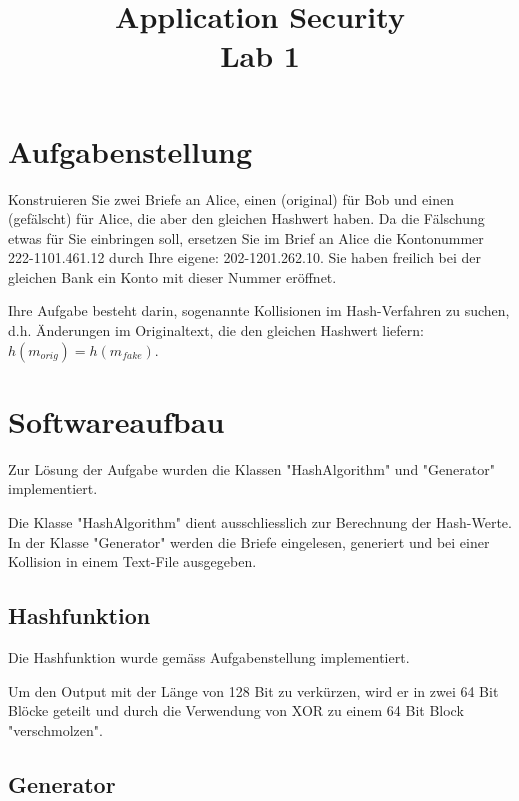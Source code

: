 \documentclass[12pt]{scrartcl}
\title{ %
Application Security
\\Lab 1
\vspace{0.2cm}
}
\begin{document}
 \maketitle
 \thispagestyle{firststyle}
 \pagestyle{firststyle}
 \begin{abstract}
 \begin{center}
 \end{center}
 \vspace{0.5cm}
\hrulefill
\end{abstract}

 \pagestyle{documentstyle}
 \tableofcontents
 \pagebreak
\section{Aufgabenstellung}
Konstruieren Sie zwei Briefe an Alice, einen (original) für Bob und einen (gefälscht) für Alice, die aber den gleichen Hashwert haben. Da die Fälschung etwas für Sie einbringen soll, ersetzen Sie im Brief an Alice die Kontonummer 222-1101.461.12 durch Ihre eigene: 202-1201.262.10. Sie haben freilich bei der gleichen Bank ein Konto mit dieser Nummer eröffnet.

Ihre Aufgabe besteht darin, sogenannte Kollisionen im Hash-Verfahren zu suchen, d.h. Änderungen
im Originaltext, die den gleichen Hashwert liefern: $ h(m_{orig}) = h(m_{fake})$.

\section{Softwareaufbau}
Zur Lösung der Aufgabe wurden die Klassen "{}HashAlgorithm"{} und "{}Generator"{} implementiert.

Die Klasse "{}HashAlgorithm"{} dient ausschliesslich zur Berechnung der Hash-Werte. In der Klasse "{}Generator"{} werden die Briefe eingelesen, generiert und bei einer Kollision in einem Text-File ausgegeben.

\subsection{Hashfunktion}
Die Hashfunktion wurde gemäss Aufgabenstellung implementiert.

Um den Output mit der Länge von 128 Bit zu verkürzen, wird er in zwei 64 Bit Blöcke geteilt und durch die Verwendung von XOR zu einem 64 Bit Block "verschmolzen".

\subsection{Generator}
\end{document}

